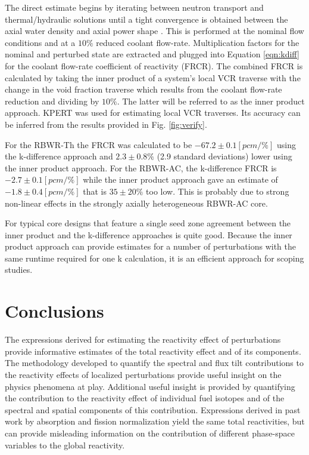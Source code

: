 \documentclass[11pt]{article}
\begin{document}
The direct estimate begins by iterating between neutron transport and thermal/hydraulic solutions until a tight convergence is obtained between the axial water density and axial power shape \cite{seifried2013aec}.
This is performed at the nominal flow conditions and at a $10\%$ reduced coolant flow-rate.
Multiplication factors for the nominal and perturbed state are extracted and plugged into Equation \ref{eqn:kdiff} for the coolant flow-rate coefficient of reactivity (FRCR).
The combined FRCR is calculated by taking the inner product of a system's local VCR traverse with the change in the void fraction traverse which results from the coolant flow-rate reduction and dividing by $10\%$.
The latter will be referred to as the inner product approach.
KPERT was used for estimating local VCR traverses.
Its accuracy can be inferred from the results provided in Fig. \ref{fig:verify}.

For the RBWR-Th the FRCR was calculated to be $-67.2 \pm 0.1 [pcm/\%]$ using the k-difference approach and $2.3 \pm 0.8\%$ (2.9 standard deviations) lower using the inner product approach.
For the RBWR-AC, the k-difference FRCR is $-2.7 \pm 0.1 [pcm/\%]$ while the inner product approach gave an estimate of $-1.8 \pm 0.4 [pcm/\%]$ that is $35 \pm 20\%$ too low.
This is probably due to strong non-linear effects in the strongly axially heterogeneous RBWR-AC core.

For typical core designs that feature a single seed zone agreement between the inner product and the k-difference approaches is quite good.
Because the inner product approach can provide estimates for a number of perturbations with the same runtime required for one k calculation, it is an efficient approach for scoping studies. 

\section{Conclusions}
\label{sec:conclusion}

The expressions derived for estimating the reactivity effect of perturbations provide informative estimates of the total reactivity effect and of its components.
The methodology developed to quantify the spectral and flux tilt contributions to the reactivity effects of localized perturbations provide useful insight on the physics phenomena at play.
Additional useful insight is provided by quantifying the contribution to the reactivity effect of individual fuel isotopes and of the spectral and spatial components of this contribution.
Expressions derived in past work by absorption and fission normalization yield the same total reactivities, but can provide misleading information on the contribution of different phase-space variables to the global reactivity.
\end{document}
